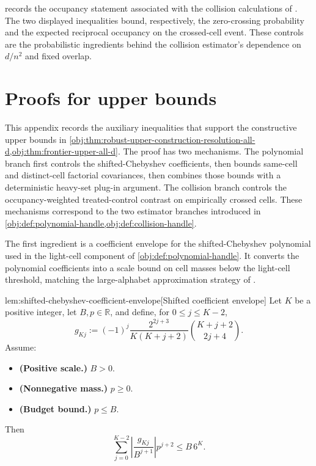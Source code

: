 \documentclass[11pt]{article}
\begin{document}
 records the occupancy statement associated with the collision calculations of \citet{ZengBalakrishnanHanKennedy2024}. The two displayed inequalities bound, respectively, the zero-crossing probability and the expected reciprocal occupancy on the crossed-cell event. These controls are the probabilistic ingredients behind the collision estimator's dependence on \(d/n^2\) and fixed overlap.


\section{Proofs for upper bounds}

This appendix records the auxiliary inequalities that support the constructive upper bounds in \cref{obj:thm:robust-upper-construction-resolution-all-d,obj:thm:frontier-upper-all-d}. The proof has two mechanisms. The polynomial branch first controls the shifted-Chebyshev coefficients, then bounds same-cell and distinct-cell factorial covariances, then combines those bounds with a deterministic heavy-set plug-in argument. The collision branch controls the occupancy-weighted treated-control contrast on empirically crossed cells. These mechanisms correspond to the two estimator branches introduced in \cref{obj:def:polynomial-handle,obj:def:collision-handle}.

The first ingredient is a coefficient envelope for the shifted-Chebyshev polynomial used in the light-cell component of \cref{obj:def:polynomial-handle}. It converts the polynomial coefficients into a scale bound on cell masses below the light-cell threshold, matching the large-alphabet approximation strategy of \citet{JiaoVenkatHanWeissman2015,WuYang2016Entropy}.

\begin{lemmav}{lem:shifted-chebyshev-coefficient-envelope}[Shifted coefficient envelope]
Let \(K\) be a positive integer, let \(B,p\in\mathbb R\), and define, for \(0\le j\le K-2\),
\[
g_{Kj}
:=
(-1)^j
\frac{2^{2j+3}}{K(K+j+2)}
\binom{K+j+2}{2j+4}.
\]
Assume:
\begin{itemize}
\item \textbf{(Positive scale.)} \(B>0\).
\item \textbf{(Nonnegative mass.)} \(p\ge 0\).
\item \textbf{(Budget bound.)} \(p\le B\).
\end{itemize}
Then
\[
\sum_{j=0}^{K-2}
\left|\frac{g_{Kj}}{B^{j+1}}\right|p^{j+2}
\le
B\,6^K.
\]
\end{lemmav}
\end{document}
